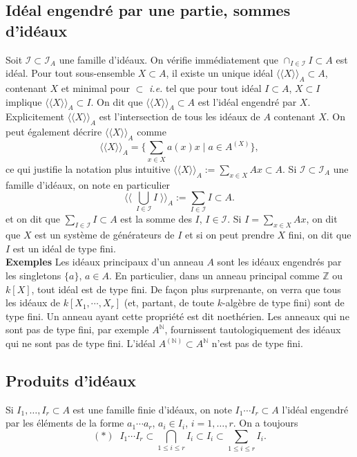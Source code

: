 \documentclass[a4paper, oneside, 12pt]{book}
\theoremstyle{theoremeStyle} %
\theoremstyle{definition} %
\newcommand{\ie}{\textit{i.e.}} %
\newcommand{\Z}{\mathbb{Z}}
\newcommand{\N}{\mathbb{N}}
\begin{document}
\subsection{Idéal engendré par une partie, sommes d'idéaux}Soit $\mathcal{I}\subset \mathcal{I}_A$ une famille d'idéaux. On vérifie immédiatement que $\cap_{I\in \mathcal{I}}I\subset A$ est idéal. Pour tout sous-ensemble $X\subset A$, il existe
un unique idéal $\langle\langle X\rangle\rangle_A \subset A$, contenant $X$ et minimal pour $\subset$ \ie{} tel que pour  tout idéal $I\subset A$,   $X\subset I$ implique  $\langle\langle X\rangle\rangle_A\subset I$. On dit que $\langle\langle X\rangle\rangle_A\subset A$ est l'idéal engendré par $X$. Explicitement $\langle\langle X\rangle\rangle_A$ est l'intersection de tous les idéaux de $A$ contenant $X$. On peut également décrire $\langle\langle X\rangle\rangle_A$ comme
$$\langle\langle X\rangle\rangle_A=\lbrace \sum_{x\in X}a(x)x\;|\; a \in A^{(X)}\rbrace,$$
ce qui justifie la notation plus intuitive $\langle\langle X\rangle\rangle_A:=\sum_{x\in X}Ax\subset A$. Si  $\mathcal{I}\subset \mathcal{I}_A$ une famille d'idéaux, on note en particulier $$ \langle\langle\; \bigcup_{I\in \mathcal{I}}I\;  \rangle\rangle_A :=\sum_{I\in \mathcal{I}}I\subset A.$$ et on dit que $\sum_{I\in \mathcal{I}}I\subset A$ est la somme des $I$, $I\in \mathcal{I}$. Si  $I=\sum_{x\in X} Ax$, on dit que $X$ est un système de générateurs de $I$ et si on peut prendre $X$ fini, on dit que $I$ est un idéal de type fini.\\

\textbf{Exemples}  Les idéaux principaux d'un anneau $A$ sont les idéaux engendrés par les singletons $\lbrace a\rbrace$, $a\in A$. En particulier, dans un anneau principal comme $\Z$ ou $k[X]$, tout idéal est de type fini.  De façon plus surprenante, on verra que tous les idéaux de $k[X_1,\cdots, X_r]$ (et, partant, de toute $k$-algèbre de type fini) sont de type fini. Un anneau ayant cette propriété est dit noethérien. Les anneaux qui ne sont pas de type fini, par exemple $A^\N$, fournissent tautologiquement des idéaux qui ne sont pas de type fini. L'idéal $A^{(\N)}\subset A^\N$ n'est pas de type fini.\\


\subsection{Produits d'idéaux}Si $I_1,\dots, I_r\subset A$ est une famille finie d'idéaux, on note $I_1\cdots I_r\subset A$ l'idéal engendré par les éléments de la forme $a_1\cdots a_r$, $a_i\in I_i$, $i=1,\dots, r$. On a toujours $$(*)\;\; I_1\cdots I_r\subset \displaystyle{\bigcap_{1\leq i\leq r}I_i}\subset I_i\subset \sum_{1\leq i\leq r} I_i.$$
\end{document}
